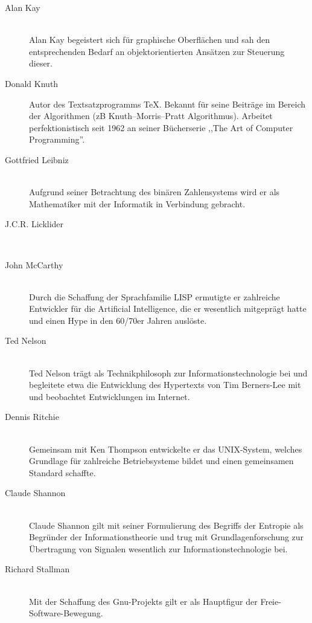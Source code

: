\begin{description}
  \item[Alan Kay ] \hfill{} \\
    Alan Kay begeistert sich für graphische Oberflächen und sah den entsprechenden Bedarf an objektorientierten Ansätzen zur Steuerung dieser.

  \item[Donald Knuth ] \hfill{}
    Autor des Textsatzprogramms \TeX. Bekannt für seine Beiträge im Bereich der Algorithmen (zB Knuth–Morris–Pratt Algorithmus). Arbeitet perfektionistisch seit 1962 an seiner Bücherserie ,,The Art of Computer Programming''.

  \item[Gottfried Leibniz ] \hfill{} \\
    Aufgrund seiner Betrachtung des binären Zahlensystems wird er als Mathematiker mit der Informatik in Verbindung gebracht.

  \item[J.C.R. Licklider ] \hfill{} \\

  \item[John McCarthy ] \hfill{} \\
    Durch die Schaffung der Sprachfamilie LISP ermutigte er zahlreiche Entwickler für die Artificial Intelligence, die er wesentlich mitgeprägt hatte und einen Hype in den 60/70er Jahren auslöste.

  \item[Ted Nelson ] \hfill{} \\
    Ted Nelson trägt als Technikphilosoph zur Informationstechnologie bei und begleitete etwa die Entwicklung des Hypertexts von Tim Berners-Lee mit und beobachtet Entwicklungen im Internet.

  \item[Dennis Ritchie ] \hfill{} \\
   Gemeinsam mit Ken Thompson entwickelte er das UNIX-System, welches Grundlage für zahlreiche Betriebsysteme bildet und einen gemeinsamen Standard schaffte.

  \item[Claude Shannon ] \hfill{} \\
   Claude Shannon gilt mit seiner Formulierung des Begriffs der Entropie als Begründer der Informationstheorie und trug mit Grundlagenforschung zur Übertragung von Signalen wesentlich zur Informationstechnologie bei.

  \item[Richard Stallman ] \hfill{} \\
    Mit der Schaffung des Gnu-Projekts gilt er als Hauptfigur der Freie-Software-Bewegung.


\end{description}
